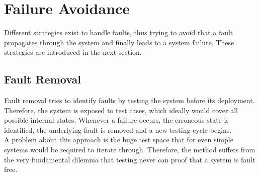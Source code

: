 \section{Failure Avoidance}

Different strategies exist to handle faults, thus trying to avoid that a fault propagates through the system and finally leads to a system failure.
These strategies are introduced in the next section.

\subsection{Fault Removal}
Fault removal tries to identify faults by testing the system before its deployment. 
\\
Therefore, the system is exposed to test cases, which ideally would cover all possible internal states. Whenever a failure occurs, the erroneous state is identified, the
underlying fault is removed and a new testing cycle begins.
\\
A problem about this approach is the huge test space that for even simple systems would be required to iterate through. Therefore, the method suffers from the very
fundamental dilemma that testing never can proof that a system is fault free.
